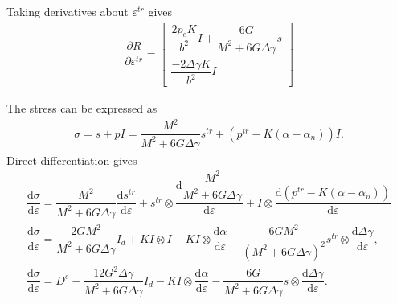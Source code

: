 \documentclass[10pt,fleqn,3p]{elsarticle}
\newcommand*{\md}[1]{\mathrm{d}#1}
\newcommand*{\ddfrac}[2]{\dfrac{\md#1}{\md#2}}
\newcommand*{\pfrac}[2]{\dfrac{\partial#1}{\partial#2}}
\begin{document}
Taking derivatives about $\varepsilon^{tr}$ gives
\begin{gather}
\pfrac{R}{\varepsilon^{tr}}=\begin{bmatrix}
\dfrac{2p_eK}{b^2}I+\dfrac{6G}{M^2+6G\Delta\gamma}s\\[4mm]
\dfrac{-2\Delta\gamma{}K}{b^2}I
\end{bmatrix}
\end{gather}

The stress can be expressed as
\begin{gather}
\sigma=s+pI=\dfrac{M^2}{M^2+6G\Delta\gamma}s^{tr}+\left(p^{tr}-K\left(\alpha-\alpha_n\right)\right)I.
\end{gather}
Direct differentiation gives
\begin{gather}
\ddfrac{\sigma}{\varepsilon}=\dfrac{M^2}{M^2+6G\Delta\gamma}\ddfrac{s^{tr}}{\varepsilon}+s^{tr}\otimes\ddfrac{\dfrac{M^2}{M^2+6G\Delta\gamma}}{\varepsilon}+I\otimes\ddfrac{\left(p^{tr}-K\left(\alpha-\alpha_n\right)\right)}{\varepsilon}\\
\ddfrac{\sigma}{\varepsilon}=\dfrac{2GM^2}{M^2+6G\Delta\gamma}I_d+KI\otimes{}I-KI\otimes\ddfrac{\alpha}{\varepsilon}-\dfrac{6GM^2}{\left(M^2+6G\Delta\gamma\right)^2}s^{tr}\otimes\ddfrac{\Delta\gamma}{\varepsilon},\\
\ddfrac{\sigma}{\varepsilon}=D^e-\dfrac{12G^2\Delta\gamma}{M^2+6G\Delta\gamma}I_d-KI\otimes\ddfrac{\alpha}{\varepsilon}-\dfrac{6G}{M^2+6G\Delta\gamma}s\otimes\ddfrac{\Delta\gamma}{\varepsilon}.
\end{gather}
\end{document}
